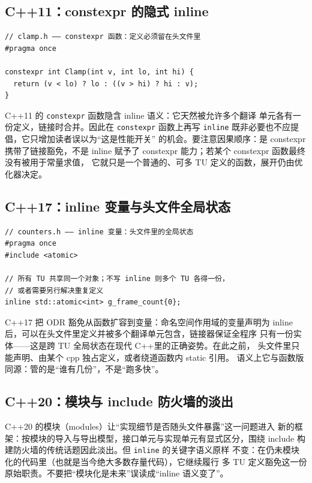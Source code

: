 \documentclass[12pt,a4paper,fontset=fandol]{ctexbook}
\newcommand{\cpp}[1]{C++#1}
\newcommand{\Tp}[1]{\texttt{#1}}
\newcommand{\Lang}[1]{\textsf{#1}}
\newcommand{\CPP}{\Lang{C++}}
\begin{document}
\subsection{\cpp{11}：constexpr 的隐式 inline}
\label{sec:ch08-constexpr}

\begin{lstlisting}[style=cppstyle]
// clamp.h —— constexpr 函数：定义必须留在头文件里
#pragma once

constexpr int Clamp(int v, int lo, int hi) {
  return (v < lo) ? lo : ((v > hi) ? hi : v);
}
\end{lstlisting}

\cpp{11} 的 \Tp{constexpr} 函数隐含 inline 语义：它天然被允许多个翻译
单元各有一份定义，链接时合并。因此在 \Tp{constexpr} 函数上再写
\Tp{inline} 既非必要也不应提倡，它只增加读者误以为``这是性能开关''
的机会。要注意因果顺序：是 constexpr 携带了链接豁免，不是 inline
赋予了 constexpr 能力；若某个 constexpr 函数最终没有被用于常量求值，
它就只是一个普通的、可多 TU 定义的函数，展开仍由优化器决定。

\subsection{\cpp{17}：inline 变量与头文件全局状态}
\label{sec:ch08-var}

\begin{lstlisting}[style=cppstyle]
// counters.h —— inline 变量：头文件里的全局状态
#pragma once
#include <atomic>

// 所有 TU 共享同一个对象；不写 inline 则多个 TU 各得一份，
// 或者需要另行解决重复定义
inline std::atomic<int> g_frame_count{0};
\end{lstlisting}

\cpp{17} 把 ODR 豁免从函数扩容到变量：命名空间作用域的变量声明为
inline 后，可以在头文件里定义并被多个翻译单元包含，链接器保证全程序
只有一份实体——这是跨 TU 全局状态在现代 \CPP 里的正确姿势。在此之前，
头文件里只能声明、由某个 cpp 独占定义，或者绕道函数内 static 引用。
语义上它与函数版同源：管的是``谁有几份''，不是``跑多快''。

\subsection{\cpp{20}：模块与 include 防火墙的淡出}
\label{sec:ch08-modules}

\cpp{20} 的模块（modules）让``实现细节是否随头文件暴露''这一问题进入
新的框架：按模块的导入与导出模型，接口单元与实现单元有显式区分，围绕
include 构建防火墙的传统话题因此淡出。但 \Tp{inline} 的关键字语义原样
不变：在仍未模块化的代码里（也就是当今绝大多数存量代码），它继续履行
多 TU 定义豁免这一份原始职责。不要把``模块化是未来''误读成``inline
语义变了''。
\end{document}
